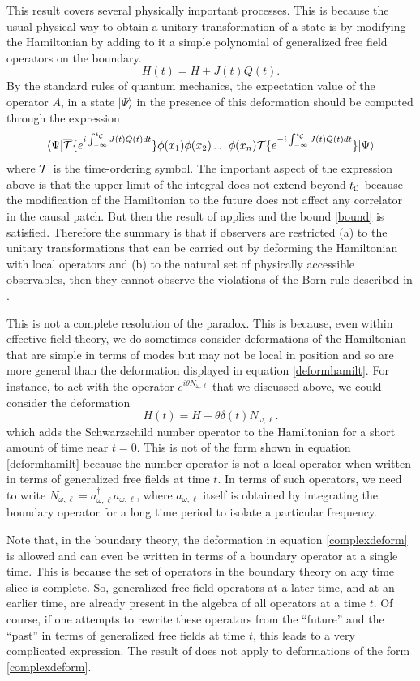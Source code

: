 \documentclass[12pt]{article}
\def\schwarzn{N}
\newcommand{\cop}[1]{#1}
\newcommand{\al}{\cop{A}} %
\def\tcaus{t_{\cal C}}
\newcommand{\be}{\begin{equation}}
\newcommand{\ee}{\end{equation}}
\begin{document}
This result covers several physically important processes. This is because the usual physical way to obtain a unitary transformation of a state is by modifying the Hamiltonian by adding to it a simple polynomial of generalized free field operators on the boundary.
\be
\label{deformhamilt}
H(t) =  H + J(t) Q(t).
\ee
By the standard rules of quantum mechanics, the expectation value of the operator $\al$, in a state $|\Psi \rangle$ in the presence of this deformation should be computed through the expression
\be
\langle \Psi| \overline{{\cal T}} \{e^{i \int_{-\infty}^{\tcaus} J(t) Q(t) d t}  \} \phi(x_1) \phi(x_2) \ldots \phi(x_n) {\cal T}\{e^{-i \int_{-\infty}^{\tcaus} J(t) Q(t) d t} \} | \Psi \rangle
\ee
where ${\cal T}$ is the time-ordering symbol. The important aspect of the expression above is that the upper limit of the integral does not extend beyond $\tcaus$ because the modification of the Hamiltonian to the future does not
affect any correlator in the causal patch.  But then the result of \cite{Raju:2016vsu} applies and the bound \eqref{bound} is satisfied. Therefore the summary is that if observers are restricted (a) to the unitary transformations that can be carried out by deforming the Hamiltonian with local operators and (b) to the natural set of physically accessible observables, then they cannot observe the  violations of the Born rule described in \cite{Marolf:2015dia}.

This is not a complete resolution of the paradox. This is because, even within effective field theory, we  do sometimes consider deformations of the Hamiltonian that are simple in terms of modes but may not be local in position and so are more general than the deformation displayed in equation \eqref{deformhamilt}.
For instance, to act with the operator $e^{i \theta \schwarzn_{\omega, \ell}}$ that we discussed above, we could consider the deformation
\be
\label{complexdeform}
H(t) = H + \theta \delta(t)  \schwarzn_{\omega, \ell}.
\ee
which adds the Schwarzschild number operator
to the Hamiltonian for a short amount of time near $t = 0$.
This is not of the form shown in equation \eqref{deformhamilt} because the number operator is not a local operator when written in terms of generalized free fields at time $t$.  In terms of such operators, we need to write $\schwarzn_{\omega, \ell} = a_{\omega, \ell}^{\dagger} a_{\omega, \ell}$, where $a_{\omega, \ell}$ itself is obtained by integrating the boundary operator for a long time period to isolate a particular frequency.

Note that, in the boundary theory, the deformation in equation \eqref{complexdeform} is allowed and can even be written in terms of a boundary operator at a single time. This is because the set of operators in the boundary theory on any time slice is complete.
So, generalized free field operators at a later time, and at an earlier time, are already present in the algebra of all operators at a time $t$. Of course, if one attempts to rewrite  these operators from the ``future'' and the ``past'' in terms of generalized free fields at time $t$, this leads to a very complicated expression.
The result of \cite{Raju:2016vsu} does not apply to deformations of the form \eqref{complexdeform}.
\end{document}
